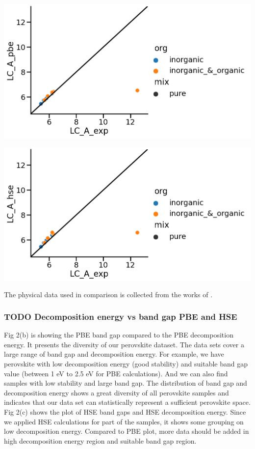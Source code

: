 \documentclass[twoside, twocolumn, 9pt, draft]{article}
\begin{document}
\begin{center}
\includegraphics[width=.9\linewidth]{pbe_v_exp_LC.png}
\end{center}
\begin{center}
\includegraphics[width=.9\linewidth]{hse_v_exp_LC.png}
\end{center}

The physical data used in comparison is collected from the works of
\citet{briones-2021-accel-lattic,jiang-2006-predic-lattic,chen-2015-under-spotl}.

\subsubsection*{{\bfseries\sffamily TODO} Decomposition energy vs band gap PBE and HSE}
\label{sec:org244f412}
Fig 2(b) is showing the PBE band gap compared to the PBE decomposition
energy. It presents the diversity of our perovskite dataset. The data
sets cover a large range of band gap and decomposition energy. For
example, we have perovskite with low decomposition energy (good
stability) and suitable band gap value (between 1 eV to 2.5 eV for PBE
calculations). And we can also find samples with low stability and large
band gap. The distribution of band gap and decomposition energy shows a
great diversity of all perovskite samples and indicates that our data
set can statistically represent a sufficient perovskite space. Fig 2(c)
shows the plot of HSE band gaps and HSE decomposition energy. Since we
applied HSE calculations for part of the samples, it shows some grouping
on low decomposition energy. Compared to PBE plot, more data should be
added in high decomposition energy region and suitable band gap region.
\end{document}
